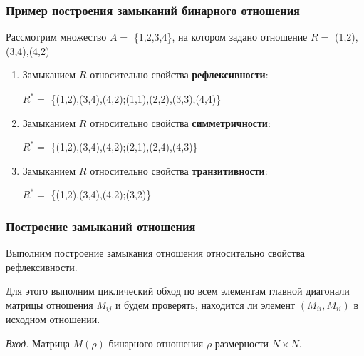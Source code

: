 \documentclass[bachelor, och, labwork]{shiza}
\begin{document}
\subsubsection{Пример построения замыканий бинарного отношения}

Рассмотрим множество $A=$ \{1,2,3,4\}, на котором задано отношение 
$R=$ {(1,2),(3,4),(4,2)} 

\begin{enumerate}

    \item Замыканием $R$ относительно свойства \textbf{рефлексивности}:
        \begin{center}

            $R^*=$ \{(1,2),(3,4),(4,2);(1,1),(2,2),(3,3),(4,4)\} 
        
        \end{center}
  
    \item Замыканием $R$ относительно свойства \textbf{симметричности}: 
        \begin{center}
    
            $R^*=$ \{(1,2),(3,4),(4,2);(2,1),(2,4),(4,3)\} 
    
        \end{center}
  
    \item Замыканием $R$ относительно свойства \textbf{транзитивности}: 
        \begin{center}
        
            $R^*=$ \{(1,2),(3,4),(4,2);(3,2)\} 
        
        \end{center}

\end{enumerate}


\subsubsection{Построение замыканий отношения}

Выполним построение замыкания отношения относительно свойства 
рефлексивности.

Для этого выполним циклический обход по всем элементам главной диагонали 
матрицы отношения $M_{ij}$ и будем проверять, находится ли элемент 
$(M_{ii},M_{ii})$ в исходном отношении.

\textit{Вход.} Матрица $M(\rho)$ бинарного отношения $\rho$ размерности
$N \times N$.
\end{document}

